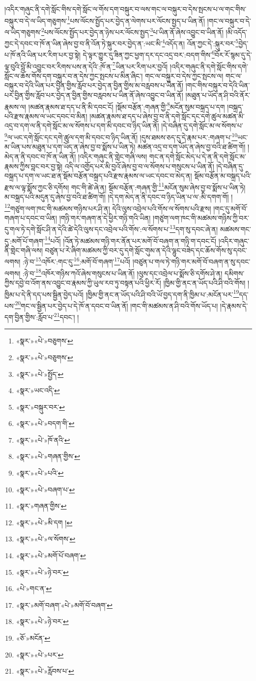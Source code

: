 །འདིར་གཞུང་ནི་དགེ་སློང་གིས་དགེ་སློང་ལ་གོས་དག་བསྐུར་བ་ལས་གང་ལ་བསྐུར་བ་དེས་སྤངས་པ་ལ་གང་གིས་བསྐུར་བ་དེ་ལ་ཡིད་གཅུགས་\footnote{«སྣར་»«པེ་»བཅུགས་}པས་ལོངས་སྤྱོད་པར་བྱེད་ན་ལེགས་པར་ལོངས་སྤྱད་པ་ཡིན་ནོ། །གང་ལ་བསྐུར་བ་དེ་ལ་ཡིད་གཅུགས་\footnote{«སྣར་»«པེ་»བཅུགས་}པས་ལོངས་སྤྱོད་པར་བྱེད་ན་ཉེས་པར་ལོངས་སྤྱད་\footnote{«སྣར་»«པེ་»སྤྱོད་}པ་ཡིན་ནོ་ཞེས་འབྱུང་བ་ཡིན་ནོ། །མི་འདོད་ཀྱང་དེ་དབང་བ་ཁོ་ན་ཡིན་ཞེས་བྱ་བ་ནི་འོན་ཏེ་སྐུར་བར་བྱེད་ན་:ཡང་མི་\footnote{«སྣར་»ཡང་འདི་}འདོད་ན། འོན་ཀྱང་དེ་:སྐུར་བར་\footnote{«སྣར་»བསྐུར་བར་}བྱེད་པ་ཁོ་ནའི་ཡིན་པར་རིག་པར་བྱ་སྟེ། དེ་ལྟར་གྱུར་དུ་ཟིན་ཀྱང་ཕྱག་དར་དང་འདྲ་བར་:བདག་གིས་\footnote{«སྣར་»«པེ་»བདག་གི་}བོར་རོ་སྙམ་དུ་དེ་ལྟ་བུའི་བློ་མི་འབྱུང་བར་རིགས་པས་ན་དེའི་:ཁོ་ན་\footnote{«སྣར་»«པེ་»ཁོ་ནའི་}ཡིན་པར་རིག་པར་བྱའོ། །འདིར་གཞུང་ནི་དགེ་སློང་གིས་དགེ་སློང་ལ་ཆོས་གོས་དག་བསྐུར་བ་ན་དེས་ཀྱང་སྤངས་པ་མིན་ཞིང་། གང་ལ་བསྐུར་བ་དེས་ཀྱང་སྤངས་ལ། གང་ལ་བསྐུར་བ་དེའི་ཡིན་པར་བྱིན་གྱིས་རློབ་པར་བྱེད་ན་བྱིན་གྱིས་མ་བརླབས་པ་ཡིན་ནོ། །གང་གིས་བསྐུར་བ་དེའི་ཡིན་པར་བྱིན་གྱིས་རློབ་པར་བྱེད་ན་བྱིན་གྱིས་བརླབས་པ་ཡིན་ནོ་ཞེས་འབྱུང་བ་ཡིན་ནོ། །མཐུན་པ་ཡོད་ན་ཤི་བའི་ནོར་རྣམས་ལ། །མཚན་རྣམས་ཐ་དད་པ་ནི་མི་དབང་ངོ། །སྡོམ་བརྩོན་:གཞན་གྱི་\footnote{«སྣར་»«པེ་»གཞན་གྱིས་}མངོན་སུམ་བསྐྲད་པ་དག །བསྐྲད་པའི་རྫས་རྣམས་ལ་ཡང་དབང་བ་མིན། །མཚན་རྣམས་ཐ་དད་པ་ཞེས་བྱ་བ་ནི་དགེ་སློང་དང་དགེ་ཚུལ་མཚན་མི་འདྲ་བ་དག་ལ་ནི་དགེ་སློང་མ་ལ་སོགས་པ་དག་མི་དབང་བ་ཉིད་ཡིན་ནོ། །དེ་བཞིན་དུ་དགེ་སློང་མ་ལ་སོགས་པ་\footnote{«སྣར་»«པེ་»པའི་}ལ་ཡང་དགེ་སློང་དང་དགེ་ཚུལ་དག་མི་དབང་བ་ཉིད་ཡིན་ནོ། །དུས་ཐམས་ཅད་དུ་དེ་རྣམ་པར་:གཞག་པ་\footnote{«སྣར་»«པེ་»བཞག་པ་}ཡང་མ་ཡིན་པས་མཐུན་པ་དག་ཡོད་ན་ཞེས་བྱ་བ་སྨོས་པ་ཡིན་ཏེ། མཚན་འདྲ་བ་དག་ཡོད་ན་ཞེས་བྱ་བའི་ཐ་ཚིག་གོ། །མེད་ན་ནི་དབང་བ་ཁོ་ན་ཡིན་ནོ། །འདིར་གཞུང་ནི་གླེང་གཞི་ལས། གང་ན་དགེ་སློང་མེད་པ་དེ་ན་ནི་དགེ་སློང་མ་རྣམས་ཀྱིས་བླང་བར་བྱ་སྟེ། འདི་ལ་འགྱོད་པར་མི་བྱའོ་ཞེས་བྱ་བ་ལ་སོགས་པ་གསུངས་པ་ཡིན་ནོ། །དེ་བཞིན་དུ་བསྐྲད་པ་དག་ལ་ཡང་ཐ་ན་སྡོམ་བརྩོན་བསྐྲད་པའི་རྫས་རྣམས་ལ་ཡང་དབང་བ་མེད་ན། སྡོམ་བརྩོན་མ་བསྐྲད་པའི་རྫས་ལ་ལྟ་སྨོས་ཀྱང་ཅི་དགོས། གང་གི་ཚེ་ཞེ་ན། སྡོམ་བརྩོན་:གཞན་གྱི་\footnote{«སྣར་»གཞན་གྱིས་}མངོན་སུམ་ཞེས་བྱ་བ་སྨོས་པ་ཡིན་ཏེ། མ་བསྐྲད་པའི་མདུན་དུ་ཞེས་བྱ་བའི་ཐ་ཚིག་གོ། །དེ་དག་མེད་ན་ནི་དབང་བ་ཉིད་ཡིན་པ་ལ་:མི་དགག་གོ། །\footnote{«སྣར་»«པེ་»མི་དག །}གཙུག་ལག་ཁང་གི་མཚམས་གཉིས་པར་ཤི་ན། དེའི་ལུས་འབྲེལ་པའི་གོས་ལ་སོགས་པའི་རྫས། །གང་དུ་མགོ་བོ་གཞག་པ་དབང་བ་ཡིན། །གཉི་གར་གཞག་ན་དེ་ཕྱིར་གཉི་གའི་ཡིན། །གཙུག་ལག་ཁང་གི་མཚམས་གཉིས་ཀྱི་བར་དུ་གལ་ཏེ་དགེ་སློང་ཤི་ན་དེའི་ཚེ་དེའི་ལུས་དང་འབྲེལ་པའི་གོས་:ལ་སོགས་པ་\footnote{«སྣར་»«པེ་»ལ་སོགས་}དག་སུ་དབང་ཞེ་ན། མཚམས་གང་དུ་:མགོ་པོ་གཞག་\footnote{«སྣར་»«པེ་»མགོ་པོ་བཞག་}པའོ། །འོན་ཏེ་མཚམས་གཉི་གར་ནོན་པར་མགོ་བོ་བཞག་ན་གཉི་ག་དབང་ངོ། །འདིར་གཞུང་ནི་གླེང་གཞི་ལས། བཙུན་པ་རེ་ཞིག་མཚམས་ཀྱི་བར་དུ་དགེ་སློང་གུམ་ན་དེའི་ལྷུང་བཟེད་དང་ཆོས་གོས་སུ་དབང་ལགས། :ཉེ་བ་\footnote{«སྣར་»«པེ་»ཉེ་བར་}འཁོར་:གང་དུ་\footnote{«པེ་»གང་ན་}:མགོ་བོ་གཞག་\footnote{«སྣར་»མགོ་བཞག་«པེ་»མགོ་བོ་བཞག་}པའོ། །བཙུན་པ་གལ་ཏེ་གཉི་གར་མགོ་བོ་བཞག་ན་སུ་དབང་ལགས། :ཉེ་བ་\footnote{«སྣར་»«པེ་»ཉེ་བར་}འཁོར་གཉིས་ཀའོ་ཞེས་གསུངས་པ་ཡིན་ནོ། །ལུས་དང་འབྲེལ་པ་སྨོས་ཅི་དགོས་ཤེ་ན། དམིགས་ཀྱིས་དབྱེ་བ་འོག་ནས་འབྱུང་བ་རྣམས་ཀྱི་ཡུལ་རབ་ཏུ་བསྟན་པའི་ཕྱིར་རོ། །ཁྱིམ་གྱི་ནང་ན་ཡོད་པའི་ཤི་བའི་གོས། །ཁྱིམ་པ་དེ་ནི་དད་པས་སྦྱིན་བྱེད་པའོ། །ཁྱིམ་གྱི་ནང་ན་ཡོད་པའི་ཤི་བའི་ཡོ་བྱད་དག་ནི་ཁྱིམ་པ་:མངོན་པར་\footnote{«ཅོ་»མངོན་}དད་པས་\footnote{«སྣར་»«པེ་»པར་}གང་ལ་སྦྱིན་པར་བྱེད་པ་དེ་ཁོ་ན་དབང་བ་ཡིན་ནོ། །གང་གི་མཚམས་ན་ཤི་བའི་གོས་ཡོད་པ། །དེ་རྣམས་དེ་དག་བྱིན་གྱིས་:རློབ་པ་\footnote{«སྣར་»«པེ་»རློབས་པ་}དབང་། །

